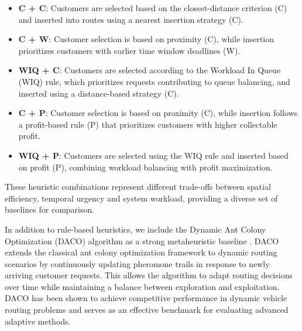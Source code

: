 \documentclass[pdflatex]{sn-jnl}
\begin{document}
\begin{itemize}
    \item \textbf{C + C}: Customers are selected based on the closest-distance criterion (C) and inserted into routes using a nearest insertion strategy (C).
    \item \textbf{C + W}: Customer selection is based on proximity (C), while insertion prioritizes customers with earlier time window deadlines (W).
    \item \textbf{WIQ + C}: Customers are selected according to the Workload In Queue (WIQ) rule, which prioritizes requests contributing to queue balancing, and inserted using a distance-based strategy (C).
    \item \textbf{C + P}: Customer selection is based on proximity (C), while insertion follows a profit-based rule (P) that prioritizes customers with higher collectable profit.
    \item \textbf{WIQ + P}: Customers are selected using the WIQ rule and inserted based on profit (P), combining workload balancing with profit maximization.
\end{itemize}

These heuristic combinations represent different trade-offs between spatial efficiency, temporal urgency and system workload, providing a diverse set of baselines for comparison.

In addition to rule-based heuristics, we include the Dynamic Ant Colony Optimization (DACO) algorithm as a strong metaheuristic baseline \cite{hung2025adaptive}. DACO extends the classical ant colony optimization framework to dynamic routing scenarios by continuously updating pheromone trails in response to newly arriving customer requests. This allows the algorithm to adapt routing decisions over time while maintaining a balance between exploration and exploitation. DACO has been shown to achieve competitive performance in dynamic vehicle routing problems and serves as an effective benchmark for evaluating advanced adaptive methods.
\end{document}
